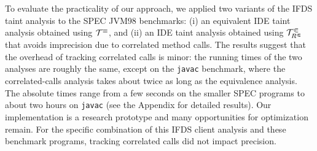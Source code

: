 To evaluate the practicality of our approach, we applied two variants of the IFDS taint analysis
to the SPEC JVM98 benchmarks: (i) an equivalent IDE taint analysis obtained using $\mathcal T^\equiv$, and (ii)
an IDE taint analysis obtained using   $\mathcal T^\Subset_{R^\Subset}$ that avoids imprecision due to correlated method
calls. 
The results suggest that the overhead of tracking correlated calls is minor: the running times of the two analyses are roughly the same,
except on the \texttt{javac} benchmark, where the correlated-calls analysis takes about twice as long as the equivalence analysis.
The absolute times range from 
a few seconds on the smaller SPEC programs to about two hours on \texttt{javac} (see the Appendix
for detailed results).
Our implementation is a research prototype and many opportunities for
optimization remain.
For the specific combination of this IFDS client analysis and these benchmark
programs, tracking correlated calls did not impact precision. 

 


